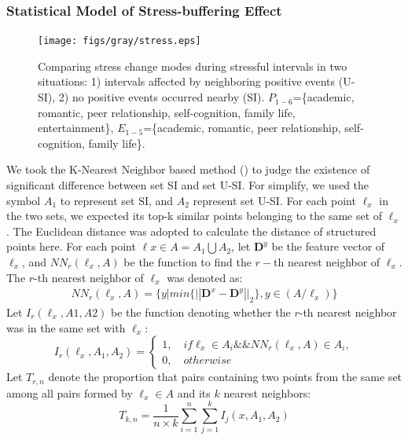 \subsubsection{Statistical Model of Stress-buffering Effect}
\begin{figure}
\centering
\texttt{[image: figs/gray/stress.eps]}
\caption{\small{Comparing stress change modes during stressful intervals in two situations:
1) intervals affected by neighboring positive events (U-SI), 2) no positive events occurred nearby (SI).
$P_{1-6}$=\{academic, romantic, peer relationship, self-cognition, family life, entertainment\},
$E_{1-5}$=\{academic, romantic, peer relationship, self-cognition, family life\}.}}
\label{fig:stress}
\end{figure}
We took the K-Nearest Neighbor based method (\cite{Schilling1986Multivariate}) to judge the existence of significant difference between set SI and set U-SI.
For simplify, we used the symbol $A_1$ to represent set SI,
and $A_2$ represent set U-SI.
For each point $\ell_{x}$ in the two sets,
we expected its top-k similar points belonging to the same set of $\ell_x$.
The Euclidean distance was adopted to calculate the distance of structured points here.
For each point $\ell x \in A=A_1\bigcup A_2$,
let $\textbf{D}^y$ be the feature vector of $\ell_x$,
and $NN_r(\ell_x,A)$ be the function to find the $r-$th nearest neighbor of $\ell_x$.
The $r$-th nearest neighbor of $\ell_x$ was denoted as:
\begin{equation}
\begin{aligned}
& NN_r(\ell_x,A) = \{y | min\{||\textbf{D}^x-\textbf{D}^y ||_2\}, y\in(A/\ell_x)\} &
\end{aligned}
\end{equation}
Let $I_r(\ell_x,A1,A2)$ be the function denoting whether the $r$-th nearest neighbor was in the same set with $\ell_x$:
\begin{equation}
I_r(\ell_x,A_1,A_2) =
\left\{ \begin{array}{ll}
1, \quad if \ell_x \in A_i  \&\& NN_r(\ell_x,A)\in A_i,\\
0, \quad otherwise
\end{array}
\right.
\end{equation}
Let $T_{r,n}$ denote the proportion that pairs containing two points from the same set among all pairs formed by $\ell_x \in A$ and its $k$ nearest neighbors:
\begin{equation}
T_{k,n}= \frac{1}{n\times k}\sum_{i=1}^{n}\sum_{j=1}^{k}I_j(x,A_1,A_2)
\end{equation}
